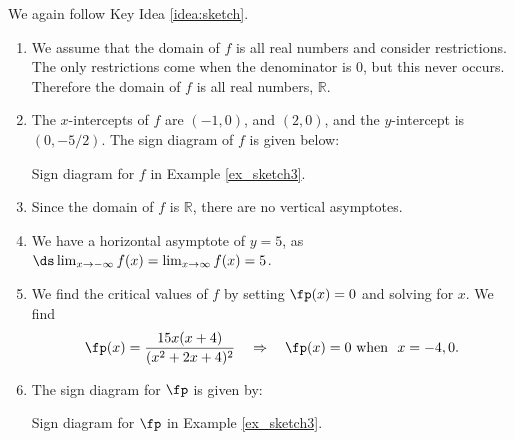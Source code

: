 {We again follow Key Idea \ref{idea:sketch}.
	\begin{enumerate}
	\item		We assume that the domain of $f$ is all real numbers and consider restrictions. The only restrictions come when the denominator is 0, but this never occurs. Therefore the domain of $f$ is all real numbers, $\mathbb{R}$.
\item The $x$-intercepts of $f$ are $(-1,0)$, and $(2,0)$, and the $y$-intercept is $(0,-5/2)$. The sign diagram of $f$ is given below:

\noindent\begin{minipage}{\textwidth}
\begin{center}
\end{center}
\captionsetup{type=figure}%
			\caption{Sign diagram for $f$ in Example \ref{ex_sketch3}.}\label{fig:sketchline3f}
\end{minipage}	

    \item Since the domain of $f$ is $\mathbb{R}$, there are no vertical asymptotes.
    
    \item		We have a horizontal asymptote of $y=5$, as $\ds \lim_{x\to-\infty}f(x) = \lim_{x\to\infty}f(x) = 5$.
    
	\item		We find the critical values of $f$ by setting $\fp(x)=0$ and solving for $x$. We find 
\[
\fp(x) = \frac{15x(x+4)}{(x^2+2x+4)^2} \quad \Rightarrow \quad \fp(x) = 0 \text{ when } \ x=-4,0.
\]

	\item The sign diagram for $\fp$ is given by:
	
\noindent\begin{minipage}{\textwidth}
\begin{center}
\end{center}
\captionsetup{type=figure}%
			\caption{Sign diagram for $\fp$ in Example \ref{ex_sketch3}.}\label{fig:sketchline3fp}
\end{minipage}	


\end{enumerate}}
